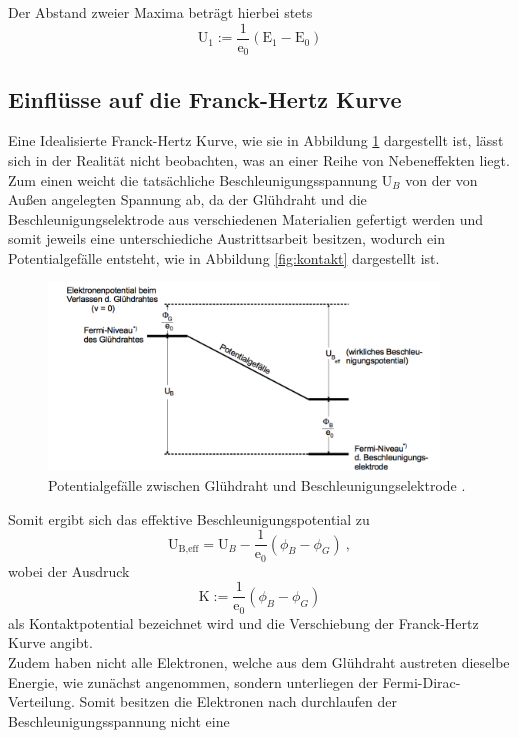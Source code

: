 Der Abstand zweier Maxima beträgt hierbei stets
\begin{equation}
  \text{U}_1 := \frac{1}{\text{e}_0} (\text{E}_1 - \text{E}_0)
\end{equation}

\subsection{Einflüsse auf die Franck-Hertz Kurve}
Eine Idealisierte Franck-Hertz Kurve, wie sie in Abbildung \ref{fig:kurve} dargestellt ist, lässt
sich in der Realität nicht beobachten, was an einer Reihe von Nebeneffekten liegt.
Zum einen weicht die tatsächliche Beschleunigungsspannung $\text{U}_B$ von der von Außen angelegten
Spannung ab, da der Glühdraht und die Beschleunigungselektrode aus verschiedenen Materialien gefertigt
werden und somit jeweils eine unterschiediche Austrittsarbeit besitzen, wodurch ein
Potentialgefälle entsteht, wie in Abbildung \ref{fig:kontakt} dargestellt ist.
\begin{figure}[H]
  \centering
  \includegraphics[height=5cm]{Kontakt.png}
  \caption{Potentialgefälle zwischen Glühdraht und Beschleunigungselektrode \cite{skript}.}
  \label{fig:kurve}
\end{figure}
Somit ergibt sich das effektive Beschleunigungspotential zu
\begin{equation}
  \text{U}_{\text{B,eff}} = \text{U}_B - \frac{1}{\text{e}_0}(\phi_B - \phi_G) \: ,
  \label{eqn:ueff}
\end{equation}
wobei der Ausdruck
\begin{equation}
  \text{K} := \frac{1}{\text{e}_0}(\phi_B - \phi_G)
  \label{eqn:kontaktpotential}
\end{equation}
als Kontaktpotential bezeichnet wird und die Verschiebung der Franck-Hertz Kurve
angibt.\\
Zudem haben nicht alle Elektronen, welche aus dem Glühdraht austreten dieselbe
Energie, wie zunächst angenommen, sondern unterliegen der Fermi-Dirac-Verteilung.
Somit besitzen die Elektronen nach durchlaufen der Beschleunigungsspannung nicht eine

